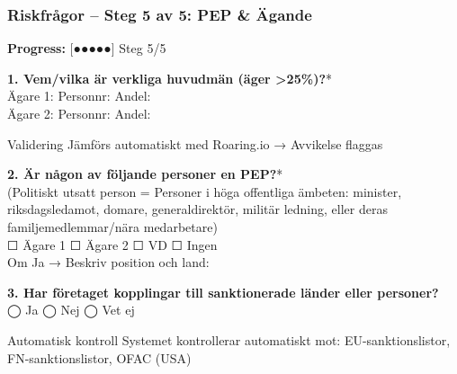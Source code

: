 \documentclass[10pt]{beamer}
\begin{document}
\begin{frame}[label=riskfragor-steg5]
  \frametitle{Riskfrågor – Steg 5 av 5: PEP \& Ägande}

  \begin{center}
    \textbf{Progress:} [●●●●●] Steg 5/5
  \end{center}

  \vspace{0.3cm}

  \footnotesize

  \textbf{1. Vem/vilka är verkliga huvudmän (äger >25\%)?}*\\
  Ägare 1: \underline{\hspace{4cm}} Personnr: \underline{\hspace{3cm}} Andel: \underline{\hspace{1.5cm}}\\
  Ägare 2: \underline{\hspace{4cm}} Personnr: \underline{\hspace{3cm}} Andel: \underline{\hspace{1.5cm}}\\
  [+ Lägg till ägare]
  \begin{block}{Validering}
    \tiny Jämförs automatiskt med Roaring.io → Avvikelse flaggas
  \end{block}

  \vspace{0.3cm}

  \textbf{2. Är någon av följande personer en PEP?}*\\
  \tiny (Politiskt utsatt person = Personer i höga offentliga ämbeten: minister, riksdagsledamot, domare, generaldirektör, militär ledning, eller deras familjemedlemmar/nära medarbetare)\\
  \vspace{0.2cm}
  ☐ Ägare 1 \hspace{0.5cm} ☐ Ägare 2 \hspace{0.5cm} ☐ VD \hspace{0.5cm} ☐ Ingen\\
  Om Ja → Beskriv position och land: \underline{\hspace{5cm}}

  \vspace{0.3cm}

  \textbf{3. Har företaget kopplingar till sanktionerade länder eller personer?}\\
  ◯ Ja \hspace{0.3cm} ◯ Nej \hspace{0.3cm} ◯ Vet ej
  \begin{block}{Automatisk kontroll}
    \tiny Systemet kontrollerar automatiskt mot: EU-sanktionslistor, FN-sanktionslistor, OFAC (USA)
  \end{block}


\end{frame}
\end{document}

